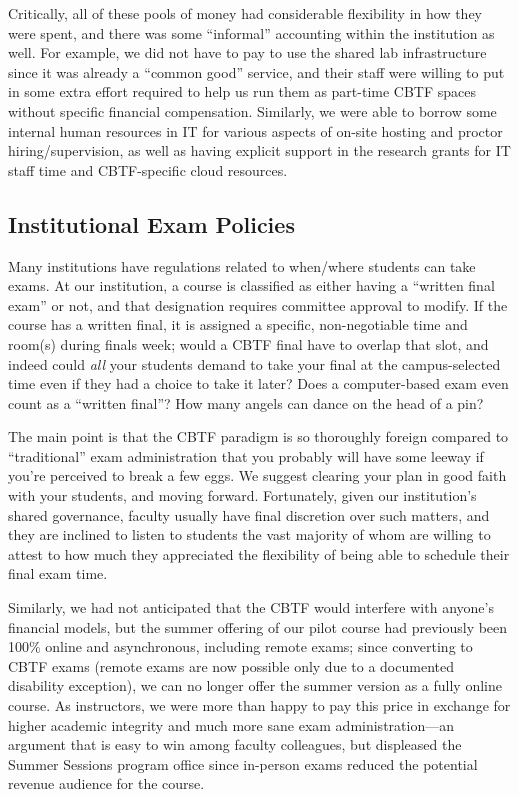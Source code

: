 Critically, all of these pools of money had considerable flexibility
in how they were spent, and there was some ``informal'' accounting
within the institution as well.  For example, we did not have to pay
to use the shared lab infrastructure since it was already a ``common
good'' service, and their staff were willing to put in some 
extra effort required to help us run them as part-time CBTF spaces
without specific financial compensation.
Similarly, we were able to borrow some internal human resources in IT for various
aspects of on-site hosting and proctor hiring/supervision,
as well as having explicit support in the research grants for IT staff time and
CBTF-specific cloud resources.

\subsection{Institutional Exam Policies}


Many institutions have regulations related to when/where students can
take exams.
At our institution, a course is classified as either having a
``written final exam'' or not, and that designation requires committee
approval to modify.
If the course has a written final,  it is assigned a specific, non-negotiable time and room(s) 
during finals week; would a CBTF final have to  overlap that slot, and
indeed could  \emph{all\/} your students demand to take your final at the
campus-selected time even if they had a choice to take it later?
Does a computer-based exam even count as a ``written final''?  How many
angels can dance on the head of a pin?

The main point is that the CBTF paradigm is so thoroughly foreign
compared to ``traditional'' exam administration that you
probably will have some leeway if you're perceived to break a few
eggs.
We suggest clearing your plan in good faith
with your students, and moving forward.  Fortunately, given our
institution's shared governance, faculty usually have
final discretion over such matters, and they are inclined to listen to
students the vast majority of whom are willing to attest to how much
they appreciated the flexibility of being able to schedule their final exam
time.

Similarly, we had not anticipated that the CBTF would interfere with anyone's
financial models, but the summer offering of our pilot course had previously
been 100\% online and asynchronous, including remote exams;
since converting to CBTF exams (remote exams are now possible only due
to a documented disability exception), we can no longer offer the
summer version as a fully online course.  As instructors, we were more
than happy to pay this price in exchange for higher academic integrity
and much more sane exam administration---an argument that is easy to
win among faculty colleagues, but displeased the Summer Sessions program office
since in-person exams reduced the potential
revenue audience for the course.

